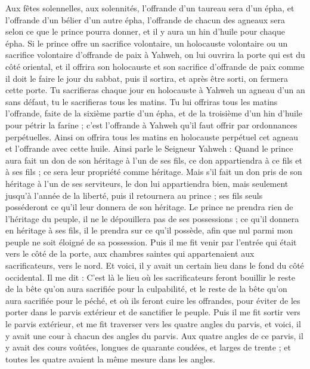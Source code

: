 \begin{multicols}{2}
Aux fêtes solennelles, aux solennités, l’offrande d’un taureau sera d'un épha, et l’offrande d'un bélier d'un autre épha, l’offrande de chacun des agneaux sera selon ce que le prince pourra donner, et il y aura un hin d'huile pour chaque épha.
Si le prince offre un sacrifice volontaire, un holocauste volontaire ou un sacrifice volontaire d’offrande de paix à Yahweh, on lui ouvrira la porte qui est du côté oriental, et il offrira son holocauste et son sacrifice d’offrande de paix comme il doit le faire le jour du sabbat, puis il sortira, et après être sorti, on fermera cette porte.
Tu sacrifieras chaque jour en holocauste à Yahweh un agneau d'un an sans défaut, tu le sacrifieras tous les matins.
Tu lui offriras tous les matins l’offrande, faite de la sixième partie d'un épha, et de la troisième d'un hin d'huile pour pétrir la farine ; c'est l’offrande à Yahweh qu'il faut offrir par ordonnances perpétuelles.
Ainsi on offrira tous les matins en holocauste perpétuel cet agneau et l’offrande avec cette huile.
Ainsi parle le Seigneur Yahweh : Quand le prince aura fait un don de son héritage à l’un de ses fils, ce don appartiendra à ce fils et à ses fils ; ce sera leur propriété comme héritage.
Mais s'il fait un don pris de son héritage à l'un de ses serviteurs, le don lui appartiendra bien, mais seulement jusqu’à l’année de la liberté, puis il retournera au prince ; ses fils seuls posséderont ce qu’il leur donnera de son héritage.
Le prince ne prendra rien de l'héritage du peuple, il ne le dépouillera pas de ses possessions ; ce qu’il donnera en héritage à ses fils, il le prendra sur ce qu’il possède, afin que nul parmi mon peuple ne soit éloigné de sa possession.
Puis il me fit venir par l'entrée qui était vers le côté de la porte, aux chambres saintes qui appartenaient aux sacrificateurs, vers le nord. Et voici, il y avait un certain lieu dans le fond du côté occidental.
Il me dit : C'est là le lieu où les sacrificateurs feront bouillir le reste de la bête qu’on aura sacrifiée pour la culpabilité, et le reste de la bête qu’on aura sacrifiée pour le péché, et où ils feront cuire les offrandes, pour éviter de les porter dans le parvis extérieur et de sanctifier le peuple.
Puis il me fit sortir vers le parvis extérieur, et me fit traverser vers les quatre angles du parvis, et voici, il y avait une cour à chacun des angles du parvis.
Aux quatre angles de ce parvis, il y avait des cours voûtées, longues de quarante coudées, et larges de trente ; et toutes les quatre avaient la même mesure dans les angles.

\end{multicols}
